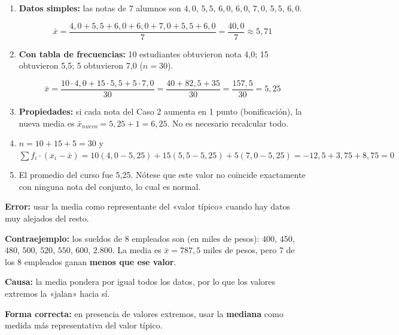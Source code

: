 \documentclass[11pt, letterpaper]{article}
\begin{document}
\begin{tcolorbox}[examplebox, title={Ej. 7. Media aritmética: datos simples, con frecuencia y propiedades}]
\begin{enumerate}[label=\textbf{\arabic*.}, leftmargin=2.8cm]
  \item[\textbf{Caso 1.}] \textbf{Datos simples:} las notas de 7 alumnos son $4{,}0$, $5{,}5$, $6{,}0$, $6{,}0$, $7{,}0$, $5{,}5$, $6{,}0$.

  \[
  \bar{x} = \frac{4{,}0 + 5{,}5 + 6{,}0 + 6{,}0 + 7{,}0 + 5{,}5 + 6{,}0}{7} = \frac{40{,}0}{7} \approx 5{,}71
  \]

  \medskip
  \item[\textbf{Caso 2.}] \textbf{Con tabla de frecuencias:} 10 estudiantes obtuvieron nota 4{,}0; 15 obtuvieron 5{,}5; 5 obtuvieron 7{,}0 ($n = 30$).

  \[
  \bar{x} = \frac{10 \cdot 4{,}0 + 15 \cdot 5{,}5 + 5 \cdot 7{,}0}{30} = \frac{40 + 82{,}5 + 35}{30} = \frac{157{,}5}{30} = 5{,}25
  \]

  \medskip
  \item[\textbf{Caso 3.}] \textbf{Propiedades:} si cada nota del Caso 2 aumenta en 1 punto (bonificación), la nueva media es $\bar{x}_{nuevo} = 5{,}25 + 1 = 6{,}25$. No es necesario recalcular todo.

  \medskip
  \item[\textbf{Verificación.}] $n = 10 + 15 + 5 = 30$ \checkmark \quad y \quad $\sum f_i \cdot (x_i - \bar{x}) = 10(4{,}0-5{,}25)+15(5{,}5-5{,}25)+5(7{,}0-5{,}25) = -12{,}5+3{,}75+8{,}75 = 0$ \checkmark

  \medskip
  \item[\textbf{Conclusión.}] El promedio del curso fue 5{,}25. Nótese que este valor no coincide exactamente con ninguna nota del conjunto, lo cual es normal.
\end{enumerate}
\end{tcolorbox}

\begin{tcolorbox}[warningbox, title={Error frecuente: la media distorsionada por valores extremos}]
\textbf{Error:} usar la media como representante del «valor típico» cuando hay datos muy alejados del resto.

\medskip
\textbf{Contraejemplo:} los sueldos de 8 empleados son (en miles de pesos):
$400$, $450$, $480$, $500$, $520$, $550$, $600$, $2.800$.
La media es $\bar{x} = 787{,}5$ miles de pesos, pero 7 de los 8 empleados ganan \textbf{menos que ese valor}.

\medskip
\textbf{Causa:} la media pondera por igual todos los datos, por lo que los valores extremos la «jalan» hacia sí.

\medskip
\textbf{Forma correcta:} en presencia de valores extremos, usar la \textbf{mediana} como medida más representativa del valor típico.
\end{tcolorbox}
\end{document}
